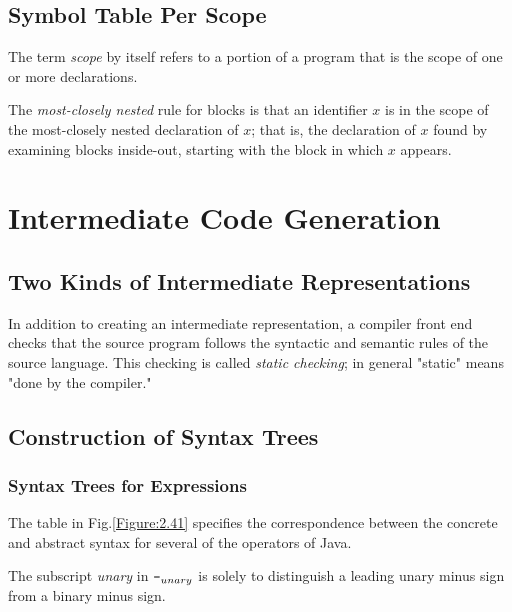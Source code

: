 \documentclass[a4paper,twoside]{book}
\begin{document}
\subsection{Symbol Table Per Scope}

The term \textit{scope} by itself refers to a portion of a program that is the scope of one or more declarations.

The \textit{most-closely nested} rule for blocks is that an identifier $x$ is in the scope of the most-closely nested declaration of $x$; that is, the declaration of $x$ found by examining blocks inside-out, starting with the block in which $x$ appears.

\section{Intermediate Code Generation}
\subsection{Two Kinds of Intermediate Representations}

In addition to creating an intermediate representation, a compiler front end checks that the source program follows the syntactic and semantic rules of the source language. This checking is called \textit{static checking}; in general "static" means "done by  the compiler."

\subsection{Construction of Syntax Trees}
\subsubsection{Syntax Trees for Expressions}

The table in Fig.\;\ref{Figure:2.41}  specifies the correspondence between the concrete and abstract syntax for several of the operators of Java.

The subscript \textit{unary} in $\verb|-|_{unary}$ is solely to distinguish a leading unary minus sign from a binary minus sign.
\end{document}
